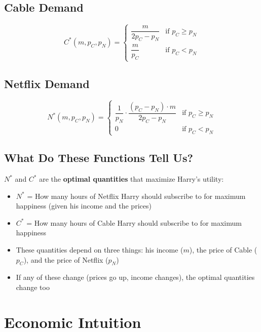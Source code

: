 \documentclass[11pt,a4paper]{article}
\begin{document}
\subsection{Cable Demand}
\[
C^*(m, p_C, p_N) = \begin{cases}
\dfrac{m}{2p_C - p_N} & \text{if } p_C \geq p_N \\[10pt]
\dfrac{m}{p_C} & \text{if } p_C < p_N
\end{cases}
\]

\subsection{Netflix Demand}
\[
N^*(m, p_C, p_N) = \begin{cases}
\dfrac{1}{p_N} \cdot \dfrac{(p_C - p_N) \cdot m}{2p_C - p_N} & \text{if } p_C \geq p_N \\[10pt]
0 & \text{if } p_C < p_N
\end{cases}
\]

\subsection{What Do These Functions Tell Us?}

$N^*$ and $C^*$ are the \textbf{optimal quantities} that maximize Harry's utility:

\begin{itemize}
    \item \textbf{$N^*$} = How many hours of Netflix Harry should subscribe to for maximum happiness (given his income and the prices)

    \item \textbf{$C^*$} = How many hours of Cable Harry should subscribe to for maximum happiness

    \item These quantities depend on three things: his income ($m$), the price of Cable ($p_C$), and the price of Netflix ($p_N$)

    \item If any of these change (prices go up, income changes), the optimal quantities change too
\end{itemize}

\section{Economic Intuition}
\end{document}
